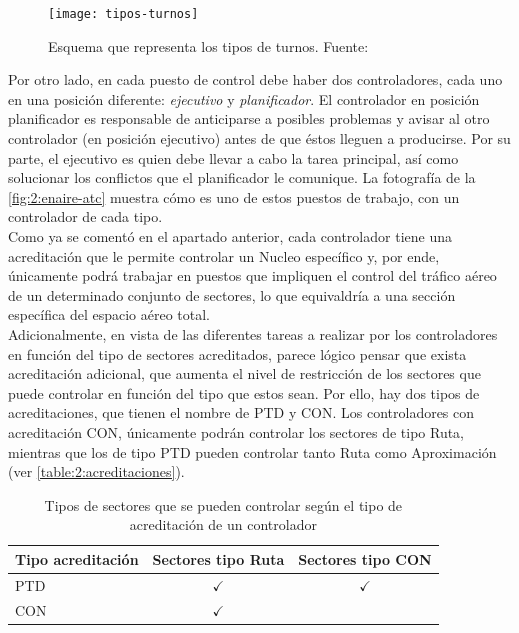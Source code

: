 \begin{figure}
	\centering
	\texttt{[image: tipos-turnos]}
	\caption[Esquema que representa los tipos de turnos]{Esquema que representa los tipos de turnos. 
	Fuente:~\cite{articulo1}}
	\label{fig:2:tipos-turnos}
\end{figure}

Por otro lado, en cada puesto de control debe haber dos controladores, cada uno en una posición diferente: 
\textit{ejecutivo} y \textit{planificador}. El controlador en posición planificador es responsable de anticiparse a 
posibles problemas y avisar al otro controlador (en posición ejecutivo) antes de que éstos lleguen a producirse. Por su 
parte, el ejecutivo es quien debe llevar a cabo la tarea principal, así como solucionar los conflictos que el 
planificador le comunique. La fotografía de la \autoref{fig:2:enaire-atc} muestra cómo es uno de estos puestos de 
trabajo, con un controlador de cada tipo.
\\

Como ya se comentó en el apartado anterior, cada controlador tiene una acreditación que le permite controlar un 
\gls{Nucleo} específico y, por ende, únicamente podrá trabajar en puestos que impliquen el control del 
tráfico aéreo de un determinado conjunto de sectores, lo que equivaldría a una sección específica del espacio aéreo 
total.
\\

Adicionalmente, en vista de las diferentes tareas a realizar por los controladores en función del tipo de sectores 
acreditados, parece lógico pensar que exista acreditación adicional, que aumenta el nivel de restricción de los 
sectores que puede controlar en función del tipo que estos sean. Por ello, hay dos tipos de acreditaciones, que tienen 
el nombre de PTD y CON. Los controladores con acreditación CON, únicamente podrán controlar los sectores de tipo Ruta, 
mientras que los de tipo PTD pueden controlar tanto Ruta como Aproximación (ver 
\autoref{table:2:acreditaciones}).

\begin{table}[h]
	\centering
	\caption[Tipos de sectores según la acreditación del controlador]{Tipos de sectores que se pueden controlar según 
	el tipo de acreditación de un controlador}
	\begin{tabular}{lcc}
		\hline
		\textbf{Tipo acreditación} & \textbf{Sectores tipo Ruta} & \textbf{Sectores tipo CON} \\ \hline
		PTD                        &        $\checkmark$         &        $\checkmark$        \\
		CON                        &        $\checkmark$         &                            \\ \hline
	\end{tabular}
	\label{table:2:acreditaciones}
\end{table}


